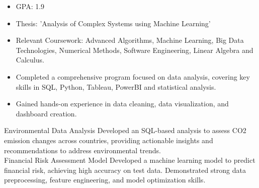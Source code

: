 \documentclass[9pt,a4paper,ragged2e,withhyper]{altacv}
\begin{document}
\begin{paracol}{2}
            \begin{itemize}
                \item GPA: 1.9
                \item Thesis: 'Analysis of Complex Systems using Machine Learning'
                \item Relevant Coursework: Advanced Algorithms, Machine Learning, Big Data Technologies, Numerical Methods, Software Engineering, Linear Algebra and Calculus.
            \end{itemize}
            \vspace{0.5em}
            \begin{itemize}
                \item Completed a comprehensive program focused on data analysis, covering key skills in SQL, Python, Tableau, PowerBI and statistical analysis.
                \item Gained hands-on experience in data cleaning, data visualization, and dashboard creation.
            \end{itemize}
            \vspace{0.5em}
        
        \cvevent
            { Environmental Data Analysis }
            {  }
            {}
            {}
        Developed an SQL-based analysis to assess CO2 emission changes across countries, providing actionable insights and recommendations to address environmental trends.\\
        \vspace{0.5em}
        \cvevent
            { Financial Risk Assessment Model }
            {  }
            {}
            {}
        Developed a machine learning model to predict financial risk, achieving high accuracy on test data. Demonstrated strong data preprocessing, feature engineering, and model optimization skills.\\
        \vspace{0.5em}

        
    \end{paracol}
\end{document}
